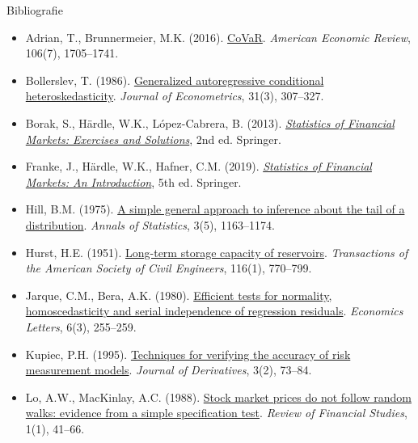 \begin{frame}{Bibliografie}
\itemsize{\tiny}
\begin{itemize}
    \item Adrian, T., Brunnermeier, M.K. (2016). \href{https://doi.org/10.1257/aer.20120555}{CoVaR}. \textit{American Economic Review}, 106(7), 1705--1741.
    \item Bollerslev, T. (1986). \href{https://doi.org/10.1016/0304-4076(86)90063-1}{Generalized autoregressive conditional heteroskedasticity}. \textit{Journal of Econometrics}, 31(3), 307--327.
    \item Borak, S., Härdle, W.K., López-Cabrera, B. (2013). \href{https://doi.org/10.1007/978-3-642-33929-5}{\textit{Statistics of Financial Markets: Exercises and Solutions}}, 2nd ed. Springer.
    \item Franke, J., Härdle, W.K., Hafner, C.M. (2019). \href{https://doi.org/10.1007/978-3-030-13751-9}{\textit{Statistics of Financial Markets: An Introduction}}, 5th ed. Springer.
    \item Hill, B.M. (1975). \href{https://doi.org/10.1214/aos/1176343247}{A simple general approach to inference about the tail of a distribution}. \textit{Annals of Statistics}, 3(5), 1163--1174.
    \item Hurst, H.E. (1951). \href{https://doi.org/10.1061/TACEAT.0006518}{Long-term storage capacity of reservoirs}. \textit{Transactions of the American Society of Civil Engineers}, 116(1), 770--799.
    \item Jarque, C.M., Bera, A.K. (1980). \href{https://doi.org/10.1016/0165-1765(80)90024-5}{Efficient tests for normality, homoscedasticity and serial independence of regression residuals}. \textit{Economics Letters}, 6(3), 255--259.
    \item Kupiec, P.H. (1995). \href{https://doi.org/10.3905/jod.1995.407942}{Techniques for verifying the accuracy of risk measurement models}. \textit{Journal of Derivatives}, 3(2), 73--84.
    \item Lo, A.W., MacKinlay, A.C. (1988). \href{https://doi.org/10.1093/rfs/1.1.41}{Stock market prices do not follow random walks: evidence from a simple specification test}. \textit{Review of Financial Studies}, 1(1), 41--66.
\end{itemize}
\end{frame}



